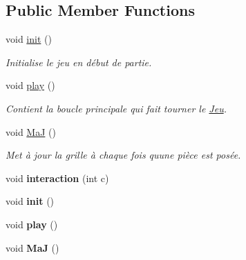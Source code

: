 \subsection*{Public Member Functions}
\begin{DoxyCompactItemize}
\item 
\mbox{\label{classJeu_af8832b6cdb31f97f5dec8ed4e38a5200}} 
void \hyperlink{classJeu_af8832b6cdb31f97f5dec8ed4e38a5200}{init} ()
\begin{DoxyCompactList}\small\item\em Initialise le jeu en début de partie. \end{DoxyCompactList}\item 
\mbox{\label{classJeu_ad339f827f08dabcb27a90844822b268e}} 
void \hyperlink{classJeu_ad339f827f08dabcb27a90844822b268e}{play} ()
\begin{DoxyCompactList}\small\item\em Contient la boucle principale qui fait tourner le \hyperlink{classJeu}{Jeu}. \end{DoxyCompactList}\item 
\mbox{\label{classJeu_a16a1b627ca2c860ab3e6ed90111619d0}} 
void \hyperlink{classJeu_a16a1b627ca2c860ab3e6ed90111619d0}{MaJ} ()
\begin{DoxyCompactList}\small\item\em Met à jour la grille à chaque fois qu\textquotesingle{}une pièce est posée. \end{DoxyCompactList}\item 
\mbox{\label{classJeu_a0ad85d37e6ffc90d919440a13404fae3}} 
void {\bfseries interaction} (int c)
\item 
\mbox{\label{classJeu_af8832b6cdb31f97f5dec8ed4e38a5200}} 
void {\bfseries init} ()
\item 
\mbox{\label{classJeu_ad339f827f08dabcb27a90844822b268e}} 
void {\bfseries play} ()
\item 
\mbox{\label{classJeu_a16a1b627ca2c860ab3e6ed90111619d0}} 
void {\bfseries MaJ} ()
\item 
\mbox{\label{classJeu_af8832b6cdb31f97f5dec8ed4e38a5200}} 

\end{DoxyCompactItemize}

